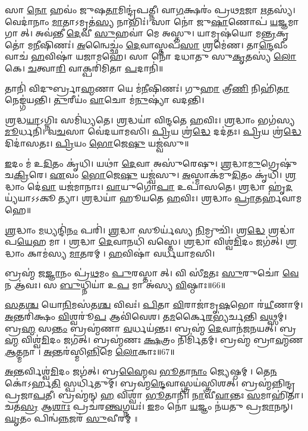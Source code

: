 𑌸𑌾 \ul{𑌨𑍋} 𑌹𑌵𑌂॑ 𑌜𑍁𑌷\ul{𑌤𑌾}𑌮𑌿𑌨𑍍𑌦𑍍𑌰॑𑌪𑌤𑍍𑌨𑍀।
𑌵𑌾\ul{𑌗}𑌕𑍍𑌷𑌰𑌂॑ 𑌪𑍍𑌰𑌥\ul{𑌮}𑌜𑌾 \ul{𑌋}𑌤𑌸𑍍𑌯॑।
𑌵𑍇𑌦𑌾॑𑌨𑌾𑌂 \ul{𑌮𑌾}𑌤𑌾𑌽𑌮𑍃𑌤॑\ul{𑌸𑍍𑌯} 𑌨𑌾𑌭𑌿𑌃॑।
𑌸𑌾 𑌨𑍋॑ 𑌜𑍁\ul{𑌷𑌾}𑌣𑍋𑌪॑ \ul{𑌯}𑌜𑍍𑌞𑌮𑌾𑌗𑌾𑌤𑍍।
𑌅𑌵॑𑌨𑍍𑌤𑍀 \ul{𑌦𑍇}𑌵𑍀 \ul{𑌸𑍁}𑌹𑌵𑌾॑ 𑌮𑍇 𑌅𑌸𑍍𑌤𑍁।
𑌯𑌾𑌮𑍃𑌷॑𑌯𑍋 𑌮\ul{𑌨𑍍𑌤𑍍𑌰}𑌕𑍃𑌤𑍋॑ 𑌮\ul{𑌨𑍀}𑌷𑌿𑌣𑌃॑।
\ul{𑌅}𑌨𑍍𑌵𑍈𑌚𑍍𑌛𑌂॑ \ul{𑌦𑍇}𑌵𑌾𑌸𑍍𑌤𑌪॑\ul{𑌸𑌾} 𑌶𑍍𑌰𑌮𑍇॑𑌣।
𑌤𑌾\ul{𑌨𑍍𑌦𑍇}𑌵𑍀𑌂 𑌵𑌾𑌚॑ \ul{𑌹}𑌵𑌿𑌷𑌾॑ 𑌯𑌜𑌾𑌮𑌹𑍇।
𑌸𑌾 𑌨𑍋॑ 𑌦𑌧𑌾𑌤𑍁 𑌸𑍁\ul{𑌕𑍃}𑌤𑌸𑍍𑌯॑ \ul{𑌲𑍋}𑌕𑍇।
\ul{𑌚}𑌤𑍍𑌵𑌾\ul{𑌰𑌿} 𑌵𑌾𑌕𑍍𑌪𑌰𑌿॑𑌮𑌿𑌤𑌾 \ul{𑌪}𑌦𑌾𑌨𑌿॑॥

𑌤𑌾𑌨𑌿॑ 𑌵𑌿𑌦𑍁𑌰𑍍𑌬𑍍𑌰𑌾\ul{𑌹𑍍𑌮}𑌣𑌾 𑌯𑍇 𑌮॑\ul{𑌨𑍀}𑌷𑌿𑌣𑌃॑।
𑌗𑍁\ul{𑌹𑌾} 𑌤𑍍𑌰𑍀\ul{𑌣𑌿} 𑌨𑌿𑌹𑌿॑\ul{𑌤𑌾} 𑌨𑍇𑌙𑍍𑌗॑𑌯𑌨𑍍𑌤𑌿।
\ul{𑌤𑍁}𑌰𑍀𑌯𑌂॑ \ul{𑌵𑌾}𑌚𑍋 𑌮॑\ul{𑌨𑍁}𑌷𑍍𑌯𑌾॑ 𑌵𑌦𑌨𑍍𑌤𑌿।


\ul{𑌶𑍍𑌰}𑌦𑍍𑌧\ul{𑌯𑌾}𑌽𑌗𑍍𑌨𑌿𑌃 𑌸𑌮𑌿॑𑌧𑍍𑌯𑌤𑍇।
\ul{𑌶𑍍𑌰}𑌦𑍍𑌧𑌯𑌾॑ 𑌵𑌿𑌨𑍍𑌦𑌤𑍇 \ul{𑌹}𑌵𑌿𑌃।
\ul{𑌶𑍍𑌰}𑌦𑍍𑌧𑌾𑌂 𑌭𑌗॑𑌸𑍍𑌯 \ul{𑌮𑍂}𑌰𑍍𑌧𑌨𑌿॑।
𑌵\ul{𑌚}𑌸𑌾 𑌵𑍇॑𑌦𑌯𑌾𑌮𑌸𑌿।
\ul{𑌪𑍍𑌰𑌿}𑌯 𑌶𑍍𑌰॑\ul{𑌦𑍍𑌧𑍇} 𑌦𑌦॑𑌤𑌃।
\ul{𑌪𑍍𑌰𑌿}𑌯 𑌶𑍍𑌰॑\ul{𑌦𑍍𑌧𑍇} 𑌦𑌿𑌦𑌾॑𑌸𑌤𑌃।
\ul{𑌪𑍍𑌰𑌿}𑌯𑌂 \ul{𑌭𑍋}𑌜𑍇\ul{𑌷𑍁} 𑌯𑌜𑍍𑌵॑𑌸𑍁॥

\ul{𑌇}𑌦𑌂 𑌮॑ 𑌉\ul{𑌦𑌿}𑌤𑌂 𑌕𑍃॑𑌧𑌿।
𑌯𑌥𑌾॑ \ul{𑌦𑍇}𑌵𑌾 𑌅𑌸𑍁॑𑌰𑍇𑌷𑍁।
\ul{𑌶𑍍𑌰}𑌦𑍍𑌧𑌾\ul{𑌮𑍁}𑌗𑍍𑌰𑍇𑌷𑍁॑ 𑌚\ul{𑌕𑍍𑌰𑌿}𑌰𑍇।
\ul{𑌏}𑌵𑌂 \ul{𑌭𑍋}𑌜𑍇\ul{𑌷𑍁} 𑌯𑌜𑍍𑌵॑𑌸𑍁।
\ul{𑌅}𑌸𑍍𑌮𑌾𑌕॑𑌮𑍁\ul{𑌦𑌿}𑌤𑌂 𑌕𑍃॑𑌧𑌿।
\ul{𑌶𑍍𑌰}𑌦𑍍𑌧𑌾𑌂 𑌦𑍇॑\ul{𑌵𑌾} 𑌯𑌜॑𑌮𑌾𑌨𑌾𑌃।
\ul{𑌵𑌾}𑌯𑍁𑌗𑍋॑\ul{𑌪𑌾} 𑌉𑌪𑌾॑𑌸𑌤𑍇।
\ul{𑌶𑍍𑌰}𑌦𑍍𑌧𑌾 𑌹𑍃॑\ul{𑌦}𑌯𑍍𑌯॑𑌯𑌾𑌽𑌽𑌕𑍂𑌤𑍍𑌯𑌾।
\ul{𑌶𑍍𑌰}𑌦𑍍𑌧𑌯𑌾॑ 𑌹𑍂𑌯𑌤𑍇 \ul{𑌹}𑌵𑌿𑌃।
\ul{𑌶𑍍𑌰}𑌦𑍍𑌧𑌾𑌂 \ul{𑌪𑍍𑌰𑌾}𑌤𑌰𑍍\mbox{}𑌹॑𑌵𑌾𑌮𑌹𑍇॥

\ul{𑌶𑍍𑌰}𑌦𑍍𑌧𑌾𑌂 \ul{𑌮}𑌧𑍍𑌯𑌨𑍍𑌦𑌿॑\ul{𑌨𑌂} 𑌪𑌰𑌿॑।
\ul{𑌶𑍍𑌰}𑌦𑍍𑌧𑌾 𑌸𑍂𑌰𑍍𑌯॑𑌸𑍍𑌯 \ul{𑌨𑌿}𑌮𑍍𑌰𑍁𑌚𑌿॑।
𑌶𑍍𑌰\ul{𑌦𑍍𑌧𑍇} 𑌶𑍍𑌰𑌦𑍍𑌧𑌾॑𑌪\ul{𑌯𑍇}𑌹 𑌮𑌾।
\ul{𑌶𑍍𑌰}𑌦𑍍𑌧𑌾 \ul{𑌦𑍇}𑌵𑌾𑌨𑌧𑌿॑ 𑌵𑌸𑍍𑌤𑍇।
\ul{𑌶𑍍𑌰}𑌦𑍍𑌧𑌾 𑌵𑌿𑌶𑍍𑌵॑\ul{𑌮𑌿}𑌦𑌂 𑌜𑌗॑𑌤𑍍।
\ul{𑌶𑍍𑌰}𑌦𑍍𑌧𑌾𑌂 𑌕𑌾𑌮॑𑌸𑍍𑌯 \ul{𑌮𑌾}𑌤𑌰𑌮𑍍।
\ul{𑌹}𑌵𑌿𑌷𑌾॑ 𑌵𑌰𑍍𑌧𑌯𑌾𑌮𑌸𑌿।

𑌬𑍍𑌰𑌹𑍍𑌮॑ 𑌜\ul{𑌜𑍍𑌞𑌾}𑌨𑌂 𑌪𑍍𑌰॑\ul{𑌥}𑌮𑌂 \ul{𑌪𑍁}𑌰𑌸𑍍𑌤𑌾𑌤𑍍।
𑌵𑌿 𑌸𑍀॑\ul{𑌮}𑌤𑌃 \ul{𑌸𑍁}𑌰𑍁𑌚𑍋॑ \ul{𑌵𑍇}𑌨 𑌆॑𑌵𑌃।
𑌸 \ul{𑌬𑍁}𑌧𑍍𑌨𑌿𑌯𑌾॑ 𑌉\ul{𑌪} 𑌮𑌾 𑌅॑𑌸𑍍𑌯 \ul{𑌵𑌿}𑌷𑍍𑌠𑌾𑌃॥66॥

\ul{𑌸}𑌤\ul{𑌶𑍍𑌚} 𑌯𑍋\ul{𑌨𑌿}𑌮𑌸॑𑌤\ul{𑌶𑍍𑌚} 𑌵𑌿𑌵𑌃॑।
\ul{𑌪𑌿}𑌤𑌾 \ul{𑌵𑌿}𑌰𑌾𑌜𑌾॑𑌮𑍃\ul{𑌷}𑌭𑍋 𑌰॑\ul{𑌯𑍀}𑌣𑌾𑌮𑍍।
\ul{𑌅}𑌨𑍍𑌤𑌰𑌿॑𑌕𑍍𑌷𑌂 \ul{𑌵𑌿}𑌶𑍍𑌵𑌰𑍂॑\ul{𑌪} 𑌆𑌵𑌿॑𑌵𑍇𑌶।
𑌤\ul{𑌮}𑌰𑍍𑌕𑍈\ul{𑌰}𑌭𑍍𑌯॑𑌰𑍍𑌚𑌨𑍍𑌤𑌿 \ul{𑌵}𑌥𑍍𑌸𑌮𑍍।
𑌬𑍍𑌰\ul{𑌹𑍍𑌮} 𑌸\ul{𑌨𑍍𑌤𑌂} 𑌬𑍍𑌰𑌹𑍍𑌮॑𑌣𑌾 \ul{𑌵}𑌰𑍍𑌧𑌯॑𑌨𑍍𑌤𑌃।
𑌬𑍍𑌰𑌹𑍍𑌮॑ \ul{𑌦𑍇}𑌵𑌾𑌨॑𑌜𑌨𑌯𑌤𑍍।
𑌬𑍍𑌰\ul{𑌹𑍍𑌮} 𑌵𑌿𑌶𑍍𑌵॑\ul{𑌮𑌿}𑌦𑌂 𑌜𑌗॑𑌤𑍍।
𑌬𑍍𑌰𑌹𑍍𑌮॑𑌣𑌃 \ul{𑌕𑍍𑌷}𑌤𑍍𑌰𑌂 𑌨𑌿𑌰𑍍𑌮𑌿॑𑌤𑌮𑍍।
𑌬𑍍𑌰𑌹𑍍𑌮॑ 𑌬𑍍𑌰𑌾\ul{𑌹𑍍𑌮}𑌣 \ul{𑌆}𑌤𑍍𑌮𑌨𑌾।
\ul{𑌅}𑌨𑍍𑌤𑌰॑𑌸𑍍𑌮𑌿\ul{𑌨𑍍𑌨𑌿}𑌮𑍇 \ul{𑌲𑍋}𑌕𑌾𑌃॥67॥

\ul{𑌅}𑌨𑍍𑌤𑌰𑍍𑌵𑌿𑌶𑍍𑌵॑\ul{𑌮𑌿}𑌦𑌂 𑌜𑌗॑𑌤𑍍।
𑌬𑍍𑌰\ul{𑌹𑍍𑌮𑍈}𑌵 \ul{𑌭𑍂}𑌤𑌾\ul{𑌨𑌾𑌂} 𑌜𑍍𑌯𑍇𑌷𑍍𑌠𑌮𑍍।
𑌤𑍇\ul{𑌨} 𑌕𑍋॑𑌽𑌰𑍍\mbox{}𑌹\ul{𑌤𑌿} 𑌸𑍍𑌪𑌰𑍍𑌧𑌿॑𑌤𑍁𑌮𑍍।
𑌬𑍍𑌰𑌹𑍍𑌮॑\ul{𑌨𑍍𑌦𑍇}𑌵𑌾𑌸𑍍𑌤𑍍𑌰𑌯॑𑌸𑍍𑌤𑍍𑌰𑌿𑌶𑌤𑍍।
𑌬𑍍𑌰𑌹𑍍𑌮॑𑌨𑍍𑌨𑌿𑌨𑍍𑌦𑍍𑌰𑌪𑍍𑌰𑌜𑌾\ul{𑌪}𑌤𑍀।
𑌬𑍍𑌰𑌹𑍍𑌮॑𑌨𑍍 \ul{𑌹} 𑌵𑌿𑌶𑍍𑌵𑌾॑ \ul{𑌭𑍂}𑌤𑌾𑌨𑌿॑।
\ul{𑌨𑌾}𑌵𑍀\ul{𑌵𑌾}𑌨𑍍𑌤𑌃 \ul{𑌸}𑌮𑌾𑌹𑌿॑𑌤𑌾।
𑌚𑌤॑\ul{𑌸𑍍𑌰} 𑌆\ul{𑌶𑌾𑌃} 𑌪𑍍𑌰𑌚॑𑌰\ul{𑌨𑍍𑌤𑍍𑌵}𑌗𑍍𑌨𑌯𑌃॑।
\ul{𑌇}𑌮𑌂 𑌨𑍋॑ \ul{𑌯}𑌜𑍍𑌞𑌂 𑌨॑𑌯𑌤𑍁 𑌪𑍍𑌰\ul{𑌜𑌾}𑌨𑌨𑍍।
\ul{𑌘𑍃}𑌤𑌂 𑌪𑌿𑌨𑍍𑌵॑\ul{𑌨𑍍𑌨}𑌜𑌰॑ \ul{𑌸𑍁}𑌵𑍀𑌰𑌮𑍍॥

